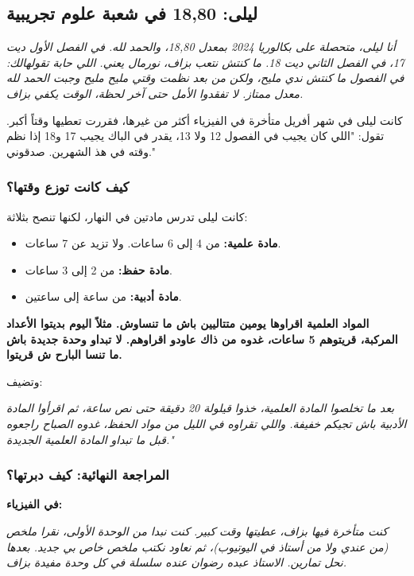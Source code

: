 \documentclass[12pt,a4paper]{book}
\newcommand{\quoteAr}[1]{%
	\begin{myquote}
		\itshape #1
	\end{myquote}
}
\newcommand{\importantAr}[1]{%
	\begin{important}
		\bfseries #1
	\end{important}
}
\begin{document}
	\subsection{ليلى: 18,80 في شعبة علوم تجريبية}
	
	\quoteAr{أنا ليلى، متحصلة على بكالوريا 2024 بمعدل 18,80، والحمد لله. في الفصل الأول ديت 17، في الفصل الثاني ديت 18. ما كنتش نتعب بزاف، نورمال يعني. اللي حابة تقولهالك: في الفصول ما كنتش ندي مليح، ولكن من بعد نظمت وقتي مليح مليح وجبت الحمد لله معدل ممتاز. لا تفقدوا الأمل حتى آخر لحظة، الوقت يكفي بزاف.}
	
	كانت ليلى في شهر أفريل متأخرة في الفيزياء أكثر من غيرها، فقررت تعطيها وقتاً أكبر. تقول: "اللي كان يجيب في الفصول 12 ولا 13، يقدر في الباك يجيب 17 و18 إذا نظم وقته في هذ الشهرين. صدقوني."
	
	\subsubsection*{كيف كانت توزع وقتها؟}
	
	كانت ليلى تدرس مادتين في النهار، لكنها تنصح بثلاثة:
	
	\begin{itemize}
		\item \textbf{مادة علمية:} من 4 إلى 6 ساعات. ولا تزيد عن 7 ساعات.
		\item \textbf{مادة حفظ:} من 2 إلى 3 ساعات.
		\item \textbf{مادة أدبية:} من ساعة إلى ساعتين.
	\end{itemize}
	
	\importantAr{المواد العلمية اقراوها يومين متتاليين باش ما تنساوش. مثلاً اليوم بديتوا الأعداد المركبة، قريتوهم 5 ساعات، غدوه من ذاك عاودو اقراوهم. لا تبداو وحدة جديدة باش ما تنسا البارح ش قريتوا.}
	
	وتضيف: 
	\quoteAr{بعد ما تخلصوا المادة العلمية، خذوا قيلولة 20 دقيقة حتى نص ساعة، ثم اقرأوا المادة الأدبية باش تجيكم خفيفة. واللي تقراوه في الليل من مواد الحفظ، غدوه الصباح راجعوه قبل ما تبداو المادة العلمية الجديدة."}
	
	
	\subsubsection*{المراجعة النهائية: كيف دبرتها؟}
	
	\textbf{في الفيزياء:}
		\quoteAr{كنت متأخرة فيها بزاف، عطيتها وقت كبير. كنت نبدا من الوحدة الأولى، نقرا ملخص (من عندي ولا من أستاذ في اليوتيوب)، ثم نعاود نكتب ملخص خاص بي جديد. بعدها نحل تمارين. الاستاذ عبده رضوان عنده سلسلة في كل وحدة مفيدة بزاف.}
\end{document}
